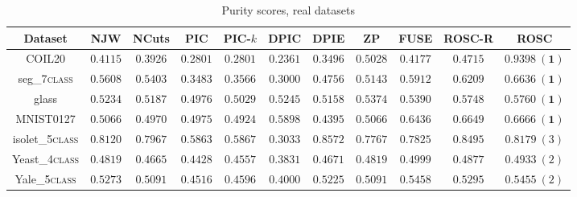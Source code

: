 \begin{table}[!htbp]

\centering
\resizebox{0.85\linewidth}{!}
{
\begin{tabular}{|c||c|c||c|c|c|c||c|c||c|c|} \hline
Dataset &NJW & NCuts  & PIC & PIC-$k$ & DPIC & DPIE & ZP & FUSE & ROSC-R & ROSC \\ \hline 
COIL20 &$0.4115$ & $0.3926$  & $0.2801$ & $0.2801$ & $0.2361$ & $0.3496$ & $0.5028$ & $0.4177$ & $0.4715$ & $\bm{0.9398\ (1)}$ \\ \hline
seg\_7\textsc{class} &$0.5608$ & $0.5403$  & $0.3483$ & $0.3566$ & $0.3000$ & $0.4756$ & $0.5143$ & $0.5912$ & $0.6209$ & $\bm{0.6636\ (1)}$ \\ \hline
glass &$0.5234$ & $0.5187$  & $0.4976$ & $0.5029$ & $0.5245$ & $0.5158$ & $0.5374$ & $0.5390$ &$0.5748$ & $\bm{0.5760\ (1)}$ \\ \hline
MNIST0127 & $0.5066$ & $0.4970$  & $0.4975$ & $0.4924$ & $0.5898$ & $0.4395$ & $0.5066$ & $0.6436$ & $0.6649$ & $\bm{0.6666\ (1)}$ \\ \hline
isolet\_5\textsc{class}&$0.8120$ & $0.7967$  & $0.5863$ & $0.5867$ & $0.3033$ & $\bm{0.8572}$ & $0.7767$ & $0.7825$ & $0.8495$ & $0.8179\ (3)$ \\ \hline
Yeast\_4\textsc{class}&$0.4819$ & $0.4665$  & $0.4428$ & $0.4557$ & $0.3831$ & $0.4671$ & $0.4819$ & $\bm{0.4999}$ & $0.4877$ & $0.4933\ (2)$ \\ \hline
Yale\_5\textsc{class}&$0.5273$ & $0.5091$  & $0.4516$ & $0.4596$ & $0.4000$ & $0.5225$ & $0.5091$ & $\bm{0.5458}$ & $0.5295$ & $0.5455\ (2)$ \\ \hline
\end{tabular}
}
\caption{Purity scores, real datasets}
\label{table:purity_real}


\end{table}
